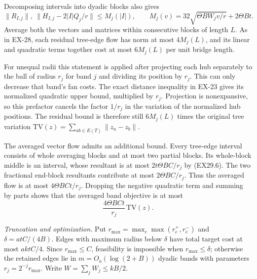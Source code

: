 Decomposing intervals into dyadic blocks also gives
\[
 \|R_{I,j}\|,\ \|H_{I,j}-2|I|Q_j/r\|
 \le M_j(|I|),\qquad
 M_j(v)=32\sqrt{\Theta BW_jv/r}+2\Theta Bt.
 \tag{EX29.8}
\]
Average both the vectors and matrices within consecutive
blocks of length $L$. As in EX-28, each residual tree-edge
flow has norm at most $4M_j(L)$, and its linear and quadratic
terms together cost at most $6M_j(L)$ per unit bridge length.

For unequal radii this statement is applied after projecting
each hub separately to the ball of radius $r_j$ for band $j$
and dividing its position by $r_j$. This can only decrease
that band's fan costs. The exact distance inequality in
EX-23 gives its normalized quadratic upper bound, multiplied
by $r_j$. Projection is nonexpansive, so this prefactor cancels
the factor $1/r_j$ in the variation of the normalized hub
positions. The residual bound is therefore still
$6M_j(L)$ times the original tree variation
$\mathrm{TV}(z)=\sum_{ab\in E(T)}\|z_a-z_b\|$.

The averaged vector flow admits an additional bound. Every
tree-edge interval consists of whole averaging blocks and at
most two partial blocks. Its whole-block middle is an interval,
whose resultant is at most $2t\Theta BC/r_j$ by (EX29.6).
The two fractional end-block resultants contribute at most
$2\Theta BC/r_j$. Thus the averaged flow is at most
$4\Theta BCt/r_j$. Dropping the negative quadratic term
and summing by parts shows that the averaged band objective
is at most
\[
 \frac{4\Theta BCt}{r_j}\,\mathrm{TV}(z).
 \tag{EX29.9}
\]

\emph{Truncation and optimization.}
Put $r_{\max}=\max_e\max(r_e^+,r_e^-)$ and
$\delta=atC/(4B)$. Edges with maximum radius below
$\delta$ have total target cost at most $aktC/4$.
Since $r_{\max}\le C$, feasibility is impossible when
$r_{\max}\le\delta$; otherwise the retained edges lie in
$m=O_a(\log(2+B))$ dyadic bands with parameters
$r_j=2^{-j}r_{\max}$. Write $W=\sum_jW_j\le kB/2$.


